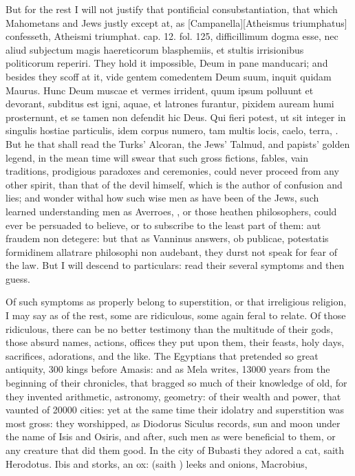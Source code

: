 {But for the rest I will not justify that pontificial consubstantiation,
that which Mahometans and Jews justly except at, as [Campanella][\textlatin{Atheismus triumphatus}]
confesseth, Atheismi triumphat. cap. 12. fol. 125, difficillimum dogma
esse, nec aliud subjectum magis haereticorum blasphemiis, et stultis
irrisionibus politicorum reperiri. They hold it impossible, Deum in
pane manducari; and besides they scoff at it, vide gentem comedentem
Deum suum, inquit quidam Maurus. Hunc Deum muscae et vermes
irrident, quum ipsum polluunt et devorant, subditus est igni, aquae, et
latrones furantur, pixidem auream humi prosternunt, et se tamen non
defendit hic Deus. Qui fieri potest, ut sit integer in singulis hostiae
particulis, idem corpus numero, tam multis locis, caelo, terra, \etc{}. But
he that shall read the Turks' Alcoran, the Jews' Talmud, and
papists' golden legend, in the mean time will swear that such gross
fictions, fables, vain traditions, prodigious paradoxes and ceremonies,
could never proceed from any other spirit, than that of the devil
himself, which is the author of confusion and lies; and wonder withal
how such wise men as have been of the Jews, such learned understanding
men as Averroes, \Avicenna{}, or those heathen philosophers, could ever be
persuaded to believe, or to subscribe to the least part of them: aut
fraudem non detegere: but that as Vanninus answers, ob publicae,
potestatis formidinem allatrare philosophi non audebant, they durst not
speak for fear of the law. But I will descend to particulars: read
their several symptoms and then guess.

Of such symptoms as properly belong to superstition, or that
irreligious religion, I may say as of the rest, some are ridiculous,
some again feral to relate. Of those ridiculous, there can be no better
testimony than the multitude of their gods, those absurd names,
actions, offices they put upon them, their feasts, holy days,
sacrifices, adorations, and the like. The Egyptians that pretended so
great antiquity, 300 kings before Amasis: and as Mela writes, 13\thinspace{}000
years from the beginning of their chronicles, that bragged so much of
their knowledge of old, for they invented arithmetic, astronomy,
geometry: of their wealth and power, that vaunted of 20\thinspace{}000 cities: yet
at the same time their idolatry and superstition was most gross: they
worshipped, as Diodorus Siculus records, sun and moon under the name of
Isis and Osiris, and after, such men as were beneficial to them, or any
creature that did them good. In the city of Bubasti they adored a cat,
saith Herodotus. Ibis and storks, an ox: (saith \Pliny{}) leeks and
onions, Macrobius,

}
